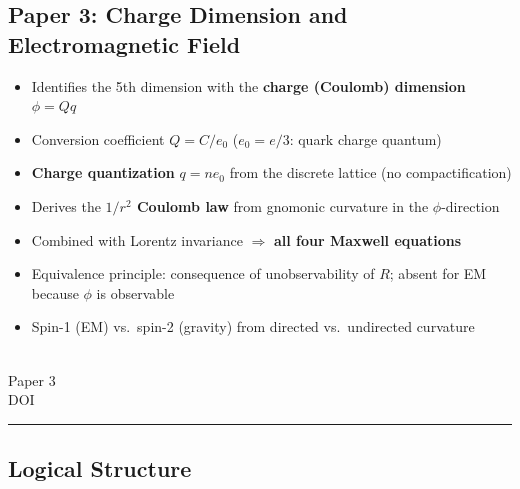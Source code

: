 \documentclass[11pt,a4paper]{article}
\begin{document}
\noindent\begin{minipage}[t]{0.82\textwidth}
\subsection*{Paper 3: Charge Dimension and Electromagnetic Field}
\vspace{-6pt}
\begin{itemize}
\item Identifies the 5th dimension with the \textbf{charge (Coulomb) dimension} $\phi = Qq$
\item Conversion coefficient $Q = C/e_0$ ($e_0 = e/3$: quark charge quantum)
\item \textbf{Charge quantization} $q = n e_0$ from the discrete lattice (no compactification)
\item Derives the \textbf{$1/r^2$ Coulomb law} from gnomonic curvature in the $\phi$-direction
\item Combined with Lorentz invariance $\Longrightarrow$ \textbf{all four Maxwell equations}
\item Equivalence principle: consequence of unobservability of $R$; absent for EM because $\phi$ is observable
\item Spin-1 (EM) vs.\ spin-2 (gravity) from directed vs.\ undirected curvature
\end{itemize}
\end{minipage}%
\hfill
\begin{minipage}[t]{0.15\textwidth}
\vspace{0pt}
\centering
{}\\[3pt]
{\scriptsize Paper 3\\DOI}
\end{minipage}

\vspace{14pt}
\hrule
\vspace{10pt}

\subsection*{Logical Structure}

\vspace{-4pt}
\begin{center}
\end{center}
\end{document}

